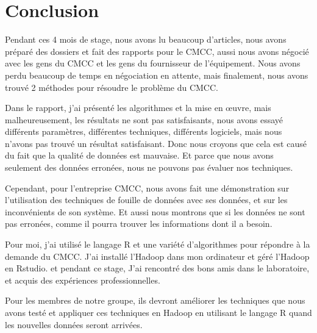 \section*{Conclusion}

Pendant ces 4 mois de stage, nous avons lu beaucoup d'articles, nous avons préparé des dossiers et fait des rapports pour le CMCC, aussi nous avons négocié avec les gens du CMCC et les gens du fournisseur de l'équipement. Nous avons perdu beaucoup de temps en négociation en attente, mais finalement, nous avons trouvé 2 méthodes pour résoudre le problème du CMCC.

Dans le rapport, j'ai présenté les algorithmes et la mise en \oe uvre, mais malheureusement, les résultats ne sont pas satisfaisants, nous avons essayé différents paramètres, différentes techniques, différents logiciels, mais nous n'avons pas trouvé un résultat satisfaisant. Donc nous croyons que cela est causé du fait que la qualité de données est mauvaise. Et parce que nous avons seulement des données erronées, nous ne pouvons pas évaluer nos techniques.

Cependant, pour l'entreprise CMCC, nous avons fait une démonstration sur l'utilisation des techniques de fouille de données avec ses données, et sur les inconvénients de son système. Et aussi nous montrons que si les données ne sont pas erronées, comme il pourra trouver les informations dont il a besoin.

Pour moi, j'ai utilisé le langage R et une variété d'algorithmes pour répondre à la demande du CMCC. J'ai installé l'Hadoop dans mon ordinateur et géré l'Hadoop en Rstudio. et pendant ce stage, J'ai rencontré des bons amis dans le laboratoire, et acquis des expériences professionnelles.

Pour les membres de notre groupe, ils devront améliorer les techniques que nous avons testé et appliquer ces techniques en Hadoop en utilisant le langage R quand les nouvelles données seront arrivées.